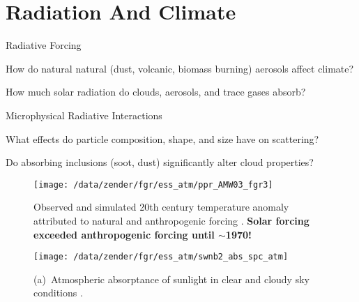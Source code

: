 \documentclass[12pt]{article}
\begin{document}
\section[Radiation And Climate]{Radiation And Climate}
\Large
\begin{enumerate*}
\item Radiative Forcing
\begin{enumerate*}
\item How do natural natural (dust, volcanic, biomass burning)
  aerosols affect climate?
\item How much solar radiation do clouds, aerosols, and trace gases absorb?
\end{enumerate*}
\item Microphysical Radiative Interactions
\begin{enumerate*}
\item What effects do particle composition, shape, and size have on scattering?
\item Do absorbing inclusions (soot, dust) significantly alter cloud properties?
\end{enumerate*}
\end{enumerate*}
\clearpage

\Large
\begin{figure*}
\centering
{} %
\texttt{[image: /data/zender/fgr/ess\_atm/ppr\_AMW03\_fgr3]}%
\caption{
Observed and simulated 20th century temperature anomaly attributed to natural and
anthropogenic forcing \cite[][Figure~3]{AMW03}. 
\textbf{Solar forcing exceeded anthropogenic forcing until $\sim$1970!}
\label{fgr:AMW03_fgr3}}
\end{figure*}
\clearpage

\Large
\begin{figure*}
\texttt{[image: /data/zender/fgr/ess\_atm/swnb2\_abs\_spc\_atm]}%
\caption{
(a)~Atmospheric absorptance of sunlight in clear and cloudy sky conditions
\cite[][]{ZBP97}. 
\label{fgr:abs_spc_atm}}
\end{figure*}
\clearpage
\end{document}
